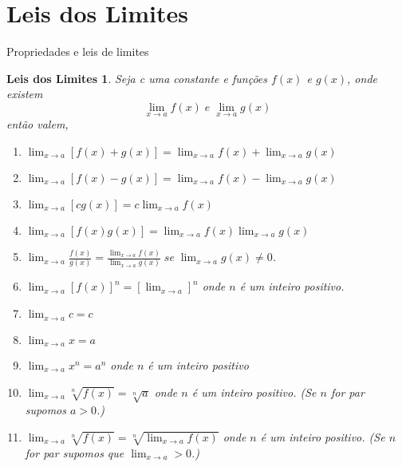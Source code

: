 \section{Leis dos Limites}
Propriedades e leis de limites

\newtheorem*{mydefLLim}{Leis dos Limites}
\begin{mydefLLim}
	Seja c uma constante e funções $f(x)$ e $g(x)$, onde existem 
		$$\lim_{x \to a} f(x) \; e \; \lim_{x \to a} g(x)$$
		então valem,
		\newline
		
		\begin{enumerate}
		\item $ \lim_{x \to a} [f(x) + g(x)] = \lim_{x \to a} f(x) + \lim_{x \to a} g(x)$
		\item $ \lim_{x \to a} [f(x) - g(x)] = \lim_{x \to a} f(x) - \lim_{x \to a} g(x)$
		\item $ \lim_{x \to a} [c  g(x)] = c \lim_{x \to a} f(x)$
		\item $ \lim_{x \to a}[f(x) g(x)] = \lim_{x \to a} f(x) \lim_{x \to a} g(x)$
		\item $ \lim_{x \to a} \frac{f(x)}{g(x)} = \frac{\lim_{x \to a} f(x)}{\lim_{x \to a} g(x)} \; se \; \lim_{x \to a} g(x) \neq 0$.
		\item $ \lim_{x \to a} [f(x)]^{n} = [\lim_{x \to a}]^n$ onde $n$ é um inteiro positivo.
		\item $ \lim_{x \to a} c = c$
		\item $ \lim_{x \to a} x = a$
		\item $ \lim_{x \to a} x^n = a^n$ onde $n$ é um inteiro  positivo
		\item $ \lim_{x \to a} \sqrt[n]{f(x)} = \sqrt[n]{a}$ onde $n$ é um inteiro positivo. (Se $n$ for par supomos $a > 0$.)
		\item $ \lim_{x \to a} \sqrt[n]{f(x)} = \sqrt[n]{\lim_{x \to a} f(x)}$ onde $n$ é um inteiro positivo. (Se $n$ for par supomos que  $\lim_{x \to a} > 0$.)
		\end{enumerate}
		
		
		
\end{mydefLLim}


